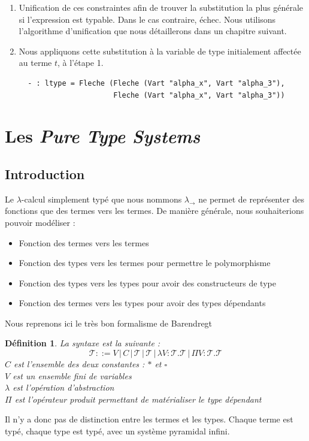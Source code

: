 \documentclass[11pt]{book}
\newtheorem{definition}{Définition}
\begin{document}
\begin{enumerate}
  \item Unification de ces constraintes afin de trouver la substitution la plus générale si l'expression est typable. 
  Dans le cas contraire, échec. Nous utilisons l'algorithme d'unification que nous détaillerons dans un chapitre suivant.

  \item Nous appliquons cette substitution à la variable de type initialement affectée au terme $t$, à l'étape 1.
\begin{Verbatim}
  - : ltype = Fleche (Fleche (Vart "alpha_x", Vart "alpha_3"),
                      Fleche (Vart "alpha_x", Vart "alpha_3"))
\end{Verbatim}
\end{enumerate}

\section{Les \textit{Pure Type Systems}}
  \subsection{Introduction}
Le $\lambda$-calcul simplement typé que nous nommons $\lambda _\rightarrow$ ne permet
de représenter des fonctions que des termes vers les termes. De manière générale, nous souhaiterions
pouvoir modéliser :
\begin{itemize}
  \item Fonction des termes vers les termes 
  \item Fonction des types vers les termes pour permettre le polymorphisme
  \item Fonction des types vers les types pour avoir des constructeurs de type 
  \item Fonction des termes vers les types pour avoir des types dépendants
\end{itemize}
Nous reprenons ici le très bon formalisme de Barendregt \cite{baren}
\begin{definition}
  La syntaxe est la suivante :
  $$ \mathcal{T} ::= V \,|\, C \,|\,\mathcal{T} \,| \,\mathcal{T} 
  \,|\, \lambda V:\mathcal{T}.\mathcal{T} \,|\, \Pi V : \mathcal{T}.\mathcal{T}
  $$
  $C$ est l'ensemble des deux constantes : $*$ et $\square$ \\
  $V$ est un ensemble fini de variables \\
  $\lambda$ est l'opération d'abstraction \\
  $\Pi$ est l'opérateur produit permettant de matérialiser le type dépendant 
\end{definition}
Il n'y a donc pas de distinction entre les termes et les types. Chaque terme est typé, chaque type est typé, avec un système pyramidal
infini.
\end{document}
